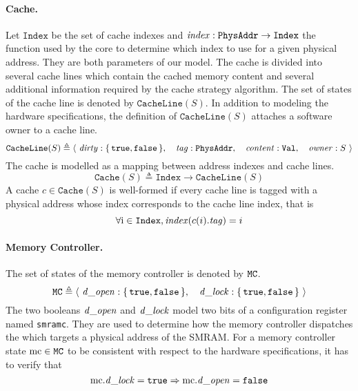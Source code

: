 \paragraph{Cache.}
%
Let $\texttt{Index}$ be the set of cache indexes and
$\mathit{index} : \texttt{PhysAddr} \rightarrow \texttt{Index}$ the function used
by the core to determine which index to use for a given physical address.
%
They are both parameters of our model.
%
The cache is divided into several cache lines which contain the cached memory
content and several additional information required by the cache strategy
algorithm.
%
The set of states of the cache line is denoted by $\texttt{CacheLine}(S)$.
%
In addition to modeling the hardware specifications, the definition of
$\texttt{CacheLine}(S)$ attaches a software owner to a cache line.
%
\[
  \texttt{CacheLine}(S) \triangleq \langle~\mathit{dirty} :
  \{\,\mathtt{true}, \mathtt{false}\,\},\quad\mathit{tag} :
  \texttt{PhysAddr},\quad\mathit{content}: \texttt{Val},\quad\mathit{owner}:
  S~\rangle
\]
%
The cache is modelled as a mapping between address indexes and cache lines.
%
\[
  \texttt{Cache}(S) \triangleq \texttt{Index} \rightarrow \texttt{CacheLine}(S)
\]
%
A cache \( c \in \texttt{Cache}(S) \) is well-formed if every cache line is
tagged with a physical address whose index corresponds to the cache line index,
that is
%
\[
  \forall \mathrm{i} \in \texttt{Index}, \mathit{index}(c(i).\mathit{tag}) = i
\]

\paragraph{Memory Controller.}
%
The set of states of the memory controller is denoted by $\mathtt{MC}$.
%
\[
  \texttt{MC} \triangleq \langle~\mathit{d\_open}: \{\,\mathtt{true},
    \mathtt{false}\,\},\quad\mathit{d\_lock}: \{\,\mathtt{true},
    \mathtt{false}\,\}~\rangle
\]
%
The two booleans $\mathit{d\_open}$ and $\mathit{d\_lock}$ model two bits of a
configuration register named \texttt{smramc}.
%
They are used to determine how the memory controller dispatches the \IO which
targets a physical address of the SMRAM.
%
For a memory controller state $\mathrm{mc} \in \texttt{MC}$ to be consistent with
respect to the hardware specifications, it has to verify that
%
\[
  \mathrm{mc}.\mathit{d\_lock} = \mathtt{true} \Rightarrow \mathrm{mc}.\mathit{d\_open} =
  \mathtt{false}
\]

